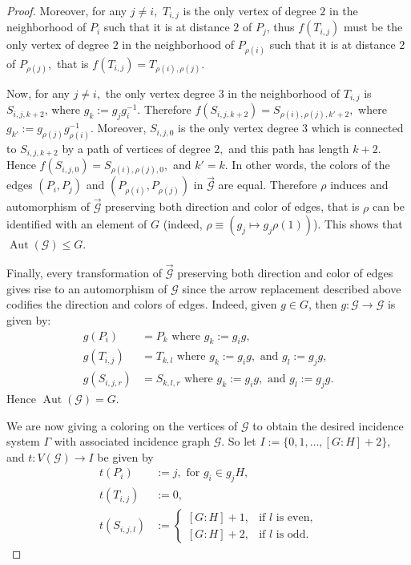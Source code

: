 \documentclass{amsart}
\theoremstyle{definition}
\theoremstyle{remark}
\newcommand{\Aut}{\operatorname{Aut}}
\begin{document}
\begin{proof}
Moreover, for any $j\ne i,$ $T_{i,j}$ is the only 
vertex of degree $2$ in the neighborhood of $P_i$ such that it is at distance $2$ of $P_j$, thus $f(T_{i,j})$ must be the only vertex of degree $2$ in the neighborhood of $P_{\rho(i)}$ such that it is at distance $2$ of $P_{\rho(j)},$ that is  $f(T_{i,j})=T_{\rho(i),\rho(j)}.$ 

Now, for any $j\ne i,$ the only vertex degree $3$ in the neighborhood of $T_{i,j}$ is $S_{i,j,k+2}$, where $g_k:=g_jg_i^{-1}$. Therefore $f(S_{i,j,k+2})=S_{\rho(i),\rho(j), k'+2},$ where $g_{k'}:=g_{\rho(j)}g_{\rho(i)}^{-1}.$ Moreover, $S_{i,j,0}$ is the only vertex degree $3$ which is connected to $S_{i,j,k+2}$ by a path of vertices of degree $2,$ and this path has length $k+2$. Hence $f(S_{i,j,0})=S_{\rho(i),\rho(j), 0},$ and $k'=k.$ In other words, the colors of the edges $(P_i,P_j)$ and $(P_{\rho(i)},P_{\rho(j)})$ in $\overrightarrow{\mathcal{G}}$ are equal. Therefore $\rho$ induces 
and automorphism of $\overrightarrow{\mathcal{G}}$ preserving both direction and color of edges, that is $\rho$ can be identified with an element of $G$ (indeed, $\rho\equiv (g_j\mapsto g_j\rho(1))$). This shows that $\Aut(\mathcal{G})\leq G.$  

Finally, every transformation of $\overrightarrow{\mathcal{G}}$ preserving both direction and color of edges gives rise to an automorphism of $\mathcal{G}$ since the arrow replacement described above codifies the direction and colors of edges. Indeed, given $g\in G$, then $g\colon \mathcal{G}\to \mathcal{G}$ is given by:
\begin{align}
g(P_i) &=P_k\text{ where $g_k:=g_ig,$}\nonumber\\ 
g(T_{i,j}) &=T_{k,l}\text{ where $g_k:=g_ig,$ and $g_l:=g_jg,$}\label{eq:G_acts_on_Graph}\\ 
g(S_{i,j,r}) &=S_{k,l,r}\text{ where $g_k:=g_ig,$ and $g_l:=g_jg.$} \nonumber  
\end{align}
Hence $\Aut(\mathcal{G})= G$.

We are now giving a coloring on the vertices of $\mathcal{G}$ to obtain the desired incidence system $\Gamma$ with associated incidence graph $\mathcal{G}$. So let $I:=\{ 0, 1,\dots, [G:H]+2\},$ and $t\colon V(\mathcal{G})\to I$ be given by
\begin{align*}
    t(P_i) &:= j,\text{ for $g_i\in g_jH$,}\\
    t(T_{i,j}) &:=0,\\
    t(S_{i,j,l}) &:= 
    \begin{cases}
        [G:H]+1,& \text{if $l$ is even,}\\
        [G:H]+2, & \text{if $l$ is odd.}
    \end{cases}
\end{align*}


\end{proof}
\end{document}

